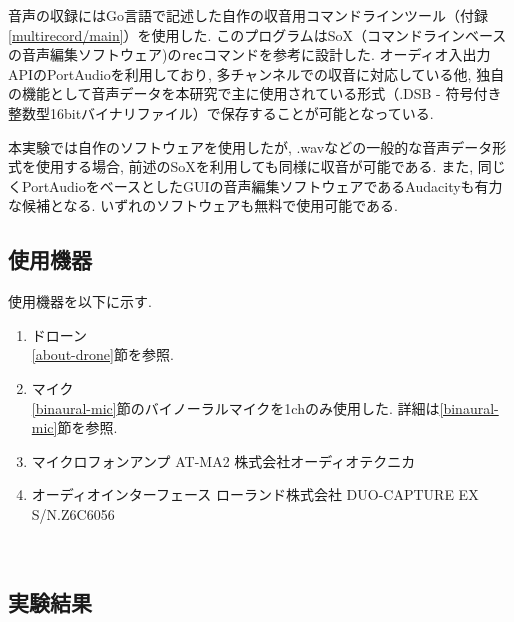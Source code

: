 音声の収録にはGo言語で記述した自作の収音用コマンドラインツール（付録\ref{multirecord/main}）を使用した. 
このプログラムはSoX（コマンドラインベースの音声編集ソフトウェア)\cite{sox:online}の\texttt{rec}コマンドを参考に設計した. 
オーディオ入出力APIのPortAudio\cite{portaudio:online}を利用しており, 多チャンネルでの収音に対応している他, 独自の機能として音声データを本研究で主に使用されている形式（.DSB - 符号付き整数型16bitバイナリファイル）で保存することが可能となっている. 

本実験では自作のソフトウェアを使用したが, .wavなどの一般的な音声データ形式を使用する場合, 前述のSoXを利用しても同様に収音が可能である. また, 同じくPortAudioをベースとしたGUIの音声編集ソフトウェアであるAudacity\cite{audacity:online}も有力な候補となる. いずれのソフトウェアも無料で使用可能である. 

\subsection{使用機器}\label{used-equipments-drone}

使用機器を以下に示す. 

\begin{enumerate}
\renewcommand{\labelenumi}{(\arabic{enumi})}
\item
  ドローン\\
  \ref{about-drone}節を参照. 
\item
  マイク \\
  \ref{binaural-mic}節のバイノーラルマイクを1chのみ使用した. 詳細は\ref{binaural-mic}節を参照. 
\item
  マイクロフォンアンプ AT-MA2 株式会社オーディオテクニカ

\item
  オーディオインターフェース ローランド株式会社 DUO-CAPTURE EX S/N.Z6C6056
  \cite{audio_interface:online}
\end{enumerate}

\
\subsection{実験結果}\label{result-drone}

